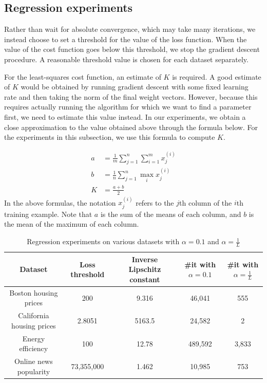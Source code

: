\documentclass[sigconf,authordraft]{acmart}
\begin{document}
\subsection{Regression experiments} \label{regexpts}
Rather than wait for absolute convergence, which may take many iterations, we instead choose to set a threshold for the value of the loss function. When the value of the cost function goes below this threshold, we stop the gradient descent procedure. A reasonable threshold value is chosen for each dataset separately.

For the least-squares cost function, an estimate of $K$ is required. A good estimate of $K$ would be obtained by running gradient descent with some fixed learning rate and then taking the norm of the final weight vectors. However, because this requires actually running the algorithm for which we want to find a parameter first, we need to estimate this value instead. In our experiments, we obtain a close approximation to the value obtained above through the formula below. For the experiments in this subsection, we use this formula to compute $K$.

\[
    \begin{aligned}
        a &= \frac{1}{m}\sum\limits_{j=1}^n \sum\limits_{i=1}^m x^{(i)}_j \\
        b &= \frac{1}{n}\sum\limits_{j=1}^n \max\limits_i x^{(i)}_j \\
        K &= \frac{a+b}{2}
    \end{aligned}
\]
In the above formulas, the notation $x^{(i)}_j$ refers to the $j$th column of the $i$th training example. Note that $a$ is the sum of the means of each column, and $b$ is the mean of the maximum of each column.

\begin{table}
    \caption{Regression experiments on various datasets with $\alpha=0.1$ and $\alpha=\frac{1}{L}$}
    \centering
    \begin{tabular}{ccccc}
        \toprule
        Dataset & Loss threshold & Inverse Lipschitz constant & \#it with $\alpha=0.1$ & \#it with $\alpha=\frac{1}{L}$ \\
        \midrule
        Boston housing prices & 200 & 9.316 & 46,041 & 555 \\
        California housing prices & 2.8051 & 5163.5 & 24,582 & 2 \\
        Energy efficiency \cite{tsanas2012accurate} & 100 & 12.78 & 489,592 & 3,833 \\
        Online news popularity \cite{fernandes2015proactive} & 73,355,000 & 1.462 & 10,985 & 753 \\
        \bottomrule
     \end{tabular}
    \label{tab:leastsq:1}
\end{table}
\end{document}
